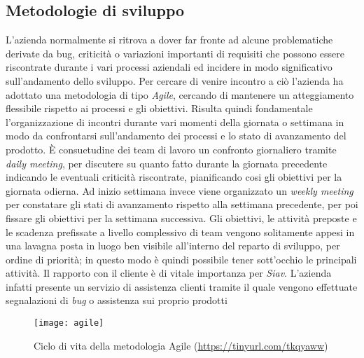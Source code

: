 \subsection{Metodologie di sviluppo}
L'azienda normalmente si ritrova a dover far fronte ad alcune problematiche derivate da bug, criticità o variazioni importanti di requisiti che possono essere riscontrate durante i vari processi aziendali ed incidere in modo significativo sull'andamento dello sviluppo.
Per cercare di venire incontro a ciò l'azienda ha adottato una metodologia di tipo \textit{Agile}, cercando di mantenere un atteggiamento flessibile rispetto ai processi e gli obiettivi. Risulta quindi fondamentale l'organizzazione di incontri durante vari momenti della giornata o settimana in modo da confrontarsi sull'andamento dei processi e lo stato di avanzamento del prodotto. È consuetudine dei team di lavoro un confronto giornaliero tramite \textit{daily meeting}, per discutere su quanto fatto durante la giornata precedente indicando le eventuali criticità riscontrate, pianificando cosi gli obiettivi per la giornata odierna. Ad inizio settimana invece viene organizzato un \textit{weekly meeting} per constatare gli stati di avanzamento rispetto alla settimana precedente, per poi fissare gli obiettivi per la settimana successiva. Gli obiettivi, le attività preposte e le scadenza prefissate a livello complessivo di team vengono solitamente appesi in una lavagna posta in luogo ben visibile all'interno del reparto di sviluppo, per ordine di priorità; in questo modo è quindi possibile tener sott'occhio le principali attività. Il rapporto con il cliente è di vitale importanza per \textit{Siav}. L'azienda infatti presente un servizio di assistenza clienti tramite il quale vengono effettuate segnalazioni di \textit{bug} o assistenza sui proprio prodotti 
\begin{figure}[!h] 
	\centering 
	\texttt{[image: agile]} 
	\caption{Ciclo di vita della metodologia Agile (\url{https://tinyurl.com/tkqyaww})}
\end{figure}
